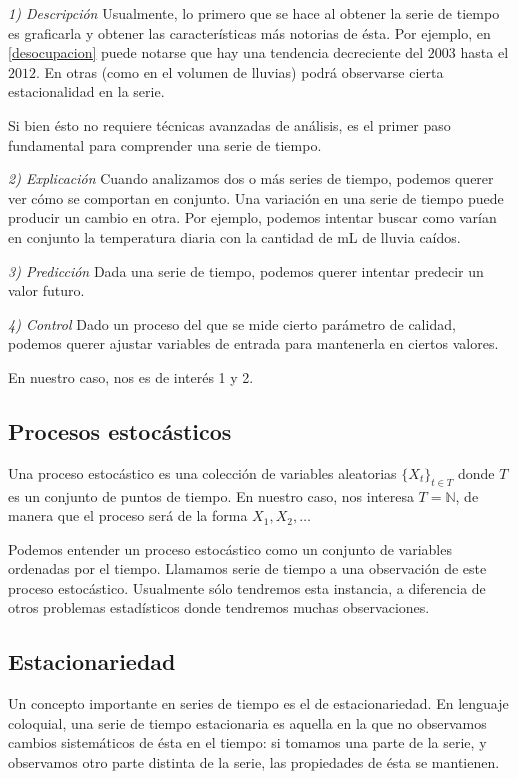 \emph{1) Descripción} Usualmente, lo primero que se hace al obtener la serie de tiempo es graficarla y obtener las características más notorias de ésta. Por ejemplo, en \ref{desocupacion} puede notarse que hay una tendencia decreciente del $2003$ hasta el $2012$. En otras (como en el volumen de lluvias) podrá observarse cierta estacionalidad en la serie.

Si bien ésto no requiere técnicas avanzadas de análisis, es el primer paso fundamental para comprender una serie de tiempo.


\emph{2) Explicación} Cuando analizamos dos o más series de tiempo, podemos querer ver cómo se comportan en conjunto. Una variación en una serie de tiempo puede producir un cambio en otra. Por ejemplo, podemos intentar buscar como varían en conjunto la temperatura diaria con la cantidad de mL de lluvia caídos.

\emph{3) Predicción} Dada una serie de tiempo, podemos querer intentar predecir un valor futuro.

\emph{4) Control} Dado un proceso del que se mide cierto parámetro de calidad, podemos querer ajustar variables de entrada para mantenerla en ciertos valores.

En nuestro caso, nos es de interés 1 y 2.


\subsection{Procesos estocásticos}

\begin{definicion}
Una proceso estocástico es una colección de variables aleatorias $\{X_t \}_{t \in T}$ donde $T$ es un conjunto de puntos de tiempo. En nuestro caso, nos interesa $T = \mathbb{N}$, de manera que el proceso será de la forma $X_1, X_2, \ldots $
\end{definicion}

Podemos entender un proceso estocástico como un conjunto de variables ordenadas por el tiempo. Llamamos serie de tiempo a una observación de este proceso estocástico. Usualmente sólo tendremos esta instancia, a diferencia de otros problemas estadísticos donde tendremos muchas observaciones.


\subsection{Estacionariedad}

Un concepto importante en series de tiempo es el de estacionariedad. En lenguaje coloquial, una serie de tiempo estacionaria es aquella en la que no observamos cambios sistemáticos de ésta en el tiempo: si tomamos una parte de la serie, y observamos otro parte distinta de la serie, las propiedades de ésta se mantienen.

